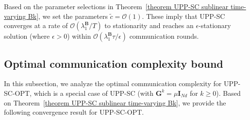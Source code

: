 \documentclass[12pt,draftcls,onecolumn]{IEEEtran}
\newcommand{\bB}{{\mathbf{B}}}
\begin{document}
Based on the parameter selections in Theorem~\ref{theorem UPP-SC sublinear time-varying Bk}, we set the parameters $\tilde{c}=\mathcal{O}(1)$. These imply that UPP-SC converges at a rate of $\mathcal{O}(\lambda_1^\bB/T)$ to stationarity and reaches an $\epsilon$-stationary solution (where $\epsilon>0$) within $\mathcal{O}(\lambda_1^\bB\tau/\epsilon)$ communication rounds.

\subsection{Optimal communication complexity bound}\label{convergence of UPP-SC-OPT}
In this subsection, we analyze the optimal communication complexity for UPP-SC-OPT, which is a special case of UPP-SC (with $\mathbf{G}^k=\mu \mathbf{I}_{Nd}$ for $k\geq 0$). Based on Theorem~\ref{theorem UPP-SC sublinear time-varying Bk}, we provide the following convergence result for UPP-SC-OPT.
\end{document}
